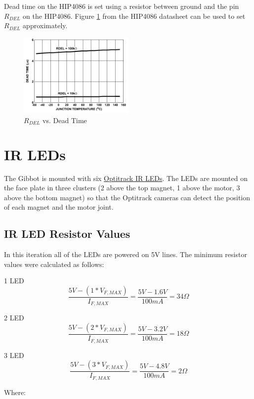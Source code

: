\documentclass{article}
\begin{document}
Dead time on the HIP4086 is set using a resistor between ground and the pin $R_{DEL}$ on the HIP4086. Figure \ref{fig:deadtime} from the HIP4086 datasheet can be used to set $R_{DEL}$ approximately.
\begin{figure}[h]
	\centering
	\includegraphics[width=0.5\textwidth]{deadtime}
	\caption{ $R_{DEL}$ vs. Dead Time\protect\footnotemark}
	\label{fig:deadtime}
\end{figure}

\section{IR LEDs}
The Gibbot is mounted with six \href{http://www.naturalpoint.com/optitrack/static/documents/850\%20nm\%20IR\%20LED\%20Data\%20Sheet.pdf}{Optitrack IR LEDs}.
The LEDs are mounted on the face plate in three clusters (2 above the top magnet, 1 above the motor, 3 above the bottom magnet) so that the Optitrack cameras can detect the position of each magnet and the motor joint. 
\subsection{IR LED Resistor Values}
In this iteration all of the LEDs are powered on 5V lines. The minimum resistor values were calculated as follows:
\begin{description}
\item{1 LED}
\[\frac{5V-(1*V_{F,MAX})}{I_{F,MAX}}=\frac{5V-1.6V}{100mA} = 34\Omega\]
\item{2 LED}
\[\frac{5V-(2*V_{F,MAX})}{I_{F,MAX}}=\frac{5V-3.2V}{100mA} = 18\Omega\]
\item{3 LED}
\[\frac{5V-(3*V_{F,MAX})}{I_{F,MAX}}=\frac{5V-4.8V}{100mA} = 2\Omega\]
\end{description}
Where:
\end{document}
